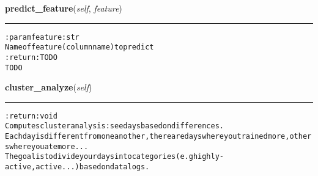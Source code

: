     \label{pygce:analysis:models:TimelineDataAnalysis:predict_feature}

    \vspace{0.5ex}

\hspace{.8\funcindent}\begin{boxedminipage}{\funcwidth}

    \raggedright \textbf{predict\_feature}(\textit{self}, \textit{feature})

    \vspace{-1.5ex}

    \rule{\textwidth}{0.5\fboxrule}
\setlength{\parskip}{2ex}
\begin{alltt}

:param feature: str
    Name of feature (column name) to predict
:return: TODO
    TODO
\end{alltt}

\setlength{\parskip}{1ex}
    \end{boxedminipage}

    \label{pygce:analysis:models:TimelineDataAnalysis:cluster_analyze}

    \vspace{0.5ex}

\hspace{.8\funcindent}\begin{boxedminipage}{\funcwidth}

    \raggedright \textbf{cluster\_analyze}(\textit{self})

    \vspace{-1.5ex}

    \rule{\textwidth}{0.5\fboxrule}
\setlength{\parskip}{2ex}
\begin{alltt}

:return: void
    Computes cluster analysis: see days based on differences.
    Each day is different from one another, there are days where you trained more, others where you ate more ...
    The goal is to divide your days into categories (e.g highly-active, active ...) based on data logs.
\end{alltt}

\setlength{\parskip}{1ex}
    \end{boxedminipage}


